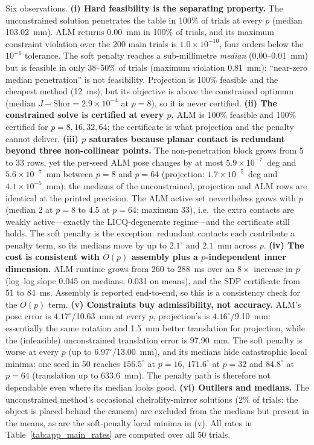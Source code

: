 Six observations. \textbf{(i) Hard feasibility is the separating property.} The unconstrained solution penetrates the table in 100\% of trials at every $p$ (median 103.02~mm). ALM returns 0.00~mm in 100\% of trials, and its maximum constraint violation over the 200 main trials is $1.0\times10^{-10}$, four orders below the $10^{-6}$ tolerance. The soft penalty reaches a sub-millimetre \emph{median} (0.00--0.01~mm) but is feasible in only 38--50\% of trials (maximum violation 0.81~mm): ``near-zero median penetration'' is not feasibility. Projection is 100\% feasible and the cheapest method (12~ms), but its objective is above the constrained optimum (median $J-\mathrm{Shor}=2.9\times10^{-4}$ at $p=8$), so it is never certified. \textbf{(ii) The constrained solve is certified at every $p$.} ALM is 100\% feasible and 100\% certified for $p=8,16,32,64$; the certificate is what projection and the penalty cannot deliver. \textbf{(iii) $p$ saturates because planar contact is redundant beyond three non-collinear points.} The non-penetration block grows from 5 to 33 rows, yet the per-seed ALM pose changes by at most $5.9\times10^{-7}$~deg and $5.6\times10^{-7}$~mm between $p=8$ and $p=64$ (projection: $1.7\times10^{-5}$~deg and $4.1\times10^{-5}$~mm); the medians of the unconstrained, projection and ALM rows are identical at the printed precision. The ALM active set nevertheless grows with $p$ (median 2 at $p=8$ to 4.5 at $p=64$; maximum 33), i.e.\ the extra contacts are weakly active---exactly the LICQ-degenerate regime---and the certificate still holds. The soft penalty is the exception: redundant contacts each contribute a penalty term, so its medians move by up to $2.1^\circ$ and $2.1$~mm across $p$. \textbf{(iv) The cost is consistent with $O(p)$ assembly plus a $p$-independent inner dimension.} ALM runtime grows from 260 to 288~ms over an $8\times$ increase in $p$ (log--log slope 0.045 on medians, 0.031 on means), and the SDP certificate from 51 to 84~ms. Assembly is reported end-to-end, so this is a consistency check for the $O(p)$ term. \textbf{(v) Constraints buy admissibility, not accuracy.} ALM's pose error is $4.17^\circ$/10.63~mm at every $p$, projection's is $4.16^\circ$/9.10~mm: essentially the same rotation and 1.5~mm better translation for projection, while the (infeasible) unconstrained translation error is 97.90~mm. The soft penalty is worse at every $p$ (up to $6.97^\circ$/13.00~mm), and its medians hide catastrophic local minima: one seed in 50 reaches $156.5^\circ$ at $p=16$, $171.6^\circ$ at $p=32$ and $84.8^\circ$ at $p=64$ (translation up to 633.6~mm). The penalty path is therefore not dependable even where its median looks good. \textbf{(vi) Outliers and medians.} The unconstrained method's occasional cheirality-mirror solutions (2\% of trials: the object is placed behind the camera) are excluded from the medians but present in the means, as are the soft-penalty local minima in (v). All rates in Table~\ref{tab:app_main_rates} are computed over all 50 trials.


